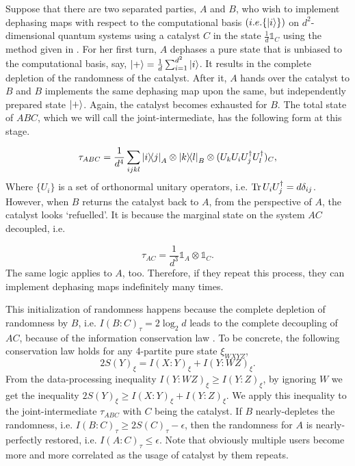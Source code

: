 \documentclass[aps, reprint, amsmath,amssymb, prx, superscriptaddress]{revtex4-2}
\begin{document}
Suppose that there are two separated parties, $A$ and $B$, who wish to implement dephasing maps with respect to the computational basis $(i.e. \{\ket{i}\})$ on $d^2$-dimensional quantum systems using a catalyst $C$ in the state $\frac{1}{d}\mathds{1}_C$ using the method given in \cite{boes2018catalytic}. For her first turn, $A$ dephases a pure state that is unbiased to the computational basis, say, $\ket{+}=\frac{1}{d}\sum_{i=1}^{d^2} \ket{i}$. It results in the complete depletion of the randomness of the catalyst. After it, $A$ hands over the catalyst to $B$ and $B$ implements the same dephasing map upon the same, but independently prepared state $\ket{+}$. Again, the catalyst becomes exhausted for $B$. The total state of $ABC$, which we will call the joint-intermediate, has the following form at this stage.

\begin{equation}
  \tau_{ABC} =  \frac{1}{d^4}\sum_{ijkl}\dyad{i}{j}_A \otimes \dyad{k}{l}_B \otimes (U_k U_i U_j^\dag U_l^\dag)_C,
\end{equation}
Where $\{U_i\}$ is a set of orthonormal unitary operators, i.e. $\Tr U_i U_j^\dag=d\delta_{ij}$. However, when $B$ returns the catalyst back to $A$, from the perspective of $A$, the catalyst looks `refuelled'. It is because the marginal state on the system $AC$ decoupled, i.e.

\begin{equation}
    \tau_{AC}= \frac{1}{d^3} \mathds{1}_A \otimes \mathds{1}_C.
\end{equation}
The same logic applies to $A$, too. Therefore, if they repeat this process, they can implement dephasing maps indefinitely many times.

This initialization of randomness happens because the complete depletion of randomness by $B$, i.e. $I(B:C)_\tau=2\log_2  d$ leads to the complete decoupling of  $AC$, because of the information conservation law \cite{lie2020randomness}. To be concrete, the following conservation law holds for any 4-partite pure state $\xi_{WXYZ}$,
\begin{equation} \label{eqn:mono}
    2S(Y)_\xi=I(X:Y)_\xi+I(Y:WZ)_\xi.
\end{equation}
From the data-processing inequality \cite{lieb1973proof} $I(Y:WZ)_\xi \geq I(Y:Z)_\xi$, by ignoring $W$ we get the inequality $2S(Y)_\xi \geq I(X:Y)_\xi + I(Y:Z)_\xi$. We apply this inequality to the joint-intermediate $\tau_{ABC}$ with $C$ being the catalyst. If $B$ nearly-depletes the randomness, i.e. $I(B:C)_\tau \geq 2S(C)_\tau - \epsilon$, then the randomness for $A$ is nearly-perfectly restored, i.e. $I(A:C)_\tau \leq \epsilon$. Note that obviously multiple users become more and more correlated as the usage of catalyst by them repeats.
\end{document}
